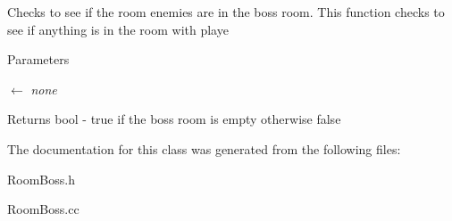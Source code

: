 Checks to see if the room enemies are in the boss room. This function checks to see if anything is in the room with playe 
\begin{DoxyParams}{Parameters}
\item[\mbox{$\leftarrow$} {\em none}]\end{DoxyParams}
\begin{DoxyReturn}{Returns}
bool -\/ true if the boss room is empty otherwise false 
\end{DoxyReturn}


The documentation for this class was generated from the following files:\begin{DoxyCompactItemize}
\item 
RoomBoss.h\item 
RoomBoss.cc\end{DoxyCompactItemize}
